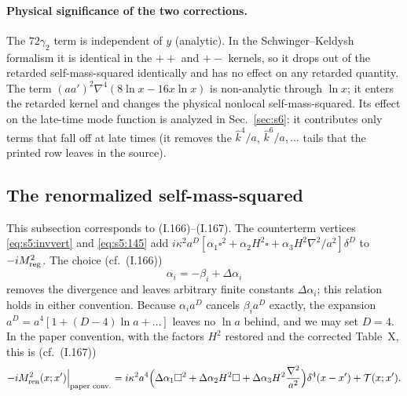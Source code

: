 \documentclass[aps,prd,onecolumn,10pt,nofootinbib,floatfix]{revtex4-2}
\newcommand{\eqI}[1]{(I.#1)}
\newcommand{\Tab}{\mathcal{T}}
\newcommand{\ren}{_{\rm ren}}
\newcommand{\reg}{_{\rm reg}}
\begin{document}
\paragraph*{Physical significance of the two corrections.}
The $72\gamma_2$ term is independent of $y$ (analytic). In the Schwinger--Keldysh formalism it is identical in the $++$ and $+-$ kernels, so it drops out of the retarded self-mass-squared identically and has no effect on any retarded quantity.
The term $(aa')^2\nabla^4(8\ln x-16x\ln x)$ is non-analytic through $\ln x$; it enters the retarded kernel and changes the physical nonlocal self-mass-squared.
Its effect on the late-time mode function is analyzed in Sec.~\ref{sec:s6}: it contributes only terms that fall off at late times (it removes the $\hat k^4/a$, $\hat k^6/a,\dots$ tails that the printed row leaves in the source).

\subsection{The renormalized self-mass-squared}
\label{sec:s5:final}

This subsection corresponds to \eqI{166}--\eqI{167}.
The counterterm vertices \eqref{eq:s5:invvert} and \eqref{eq:s5:145} add $i\kappa^2a^D[\alpha_1\square^2+\alpha_2H^2\square+\alpha_3H^2\nabla^2/a^2]\delta^D$ to $-iM^2\reg$.
The choice (cf.\ \eqI{166})
\begin{equation}
\alpha_i=-\beta_i+\Delta\alpha_i
\label{eq:s5:166}
\end{equation}
removes the divergence and leaves arbitrary finite constants $\Delta\alpha_i$; this relation holds in either convention.
Because $\alpha_ia^D$ cancels $\beta_ia^D$ exactly, the expansion $a^D=a^4[1+(D-4)\ln a+\dots]$ leaves no $\ln a$ behind, and we may set $D=4$.
In the paper convention, with the factors $H^2$ restored and the corrected Table~X, this is (cf.\ \eqI{167})
\begin{equation}
-iM^2\ren(x;x')\Big|_{\text{paper conv.}}=i\kappa^2a^4\Big(\Delta\alpha_1\square^2+\Delta\alpha_2H^2\square+\Delta\alpha_3H^2\frac{\nabla^2}{a^2}\Big)\delta^4(x-x')+\Tab(x;x').
\label{eq:s5:167p}
\end{equation}
\end{document}
